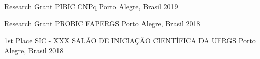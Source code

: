 









\begin{cvhonors}

  \cvhonor
    {Research Grant} %
    {PIBIC CNPq} %
    {Porto Alegre, Brasil} %
    {2019} %
    
  \cvhonor
    {Research Grant} %
    {PROBIC FAPERGS} %
    {Porto Alegre, Brasil} %
    {2018} %

  \cvhonor
    {1st Place} %
    {SIC - XXX SALÃO DE INICIAÇÃO CIENTÍFICA DA UFRGS} %
    {Porto Alegre, Brasil} %
    {2018} %

\end{cvhonors}
